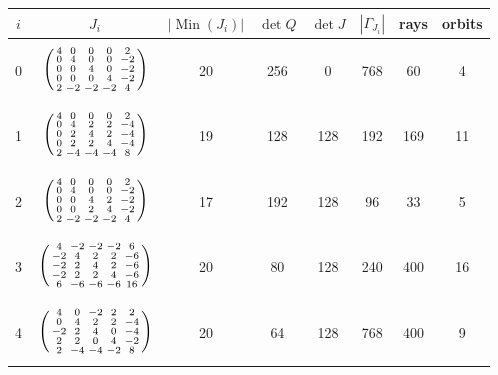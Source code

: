 \documentclass[11pt,reqno]{amsart}
\renewcommand{\_}{\origunderscore\allowbreak}
\numberwithin{equation}{section}
\theoremstyle{plain}
\theoremstyle{definition}
\theoremstyle{remark}
\newcommand{\Min}{\operatorname{Min}}
\begin{document}
\begin{table}[t]
\centering
\small
\renewcommand{\arraystretch}{1.0}
\begin{tabular}{@{}c c c c c c c c@{}}
\toprule
$i$ & $J_i$ & $|\Min(J_i)|$ & $\det Q$ & $\det J$ & $|\Gamma_{J_i}|$ & rays & orbits\\
\midrule
0 & $\vphantom{\rule[-19pt]{0pt}{42pt}}\left(\begin{smallmatrix}4&0&0&0&2\\0&4&0&0&-2\\0&0&4&0&-2\\0&0&0&4&-2\\2&-2&-2&-2&4\end{smallmatrix}\right)$ & 20 & 256 & 0 & 768 & 60 & 4\\
1 & $\vphantom{\rule[-19pt]{0pt}{42pt}}\left(\begin{smallmatrix}4&0&0&0&2\\0&4&2&2&-4\\0&2&4&2&-4\\0&2&2&4&-4\\2&-4&-4&-4&8\end{smallmatrix}\right)$ & 19 & 128 & 128 & 192 & 169 & 11\\
2 & $\vphantom{\rule[-19pt]{0pt}{42pt}}\left(\begin{smallmatrix}4&0&0&0&2\\0&4&0&0&-2\\0&0&4&2&-2\\0&0&2&4&-2\\2&-2&-2&-2&4\end{smallmatrix}\right)$ & 17 & 192 & 128 & 96 & 33 & 5\\
3 & $\vphantom{\rule[-19pt]{0pt}{42pt}}\left(\begin{smallmatrix}4&-2&-2&-2&6\\-2&4&2&2&-6\\-2&2&4&2&-6\\-2&2&2&4&-6\\6&-6&-6&-6&16\end{smallmatrix}\right)$ & 20 & 80 & 128 & 240 & 400 & 16\\
4 & $\vphantom{\rule[-19pt]{0pt}{42pt}}\left(\begin{smallmatrix}4&0&-2&2&2\\0&4&2&2&-4\\-2&2&4&0&-4\\2&2&0&4&-2\\2&-4&-4&-2&8\end{smallmatrix}\right)$ & 20 & 64 & 128 & 768 & 400 & 9\\

\end{tabular}
\end{table}
\end{document}
